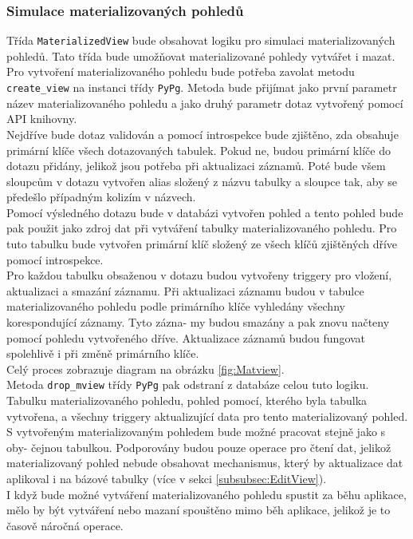 \documentclass[ing,male,java,dept456]{diploma}						%
\begin{document}
\subsubsection{Simulace materializovaných pohledů}

Třída \lstinline[style=inlinepython]|MaterializedView| bude obsahovat logiku pro simulaci materializovaných pohledů. Tato třída bude umožňovat materializované pohledy vytvářet i mazat. Pro vytvoření materializovaného pohledu bude potřeba zavolat metodu \lstinline[style=inlinepython]|create_view| na instanci třídy \lstinline[style=inlinepython]|PyPg|. Metoda bude přijímat jako první parametr název materializovaného pohledu a jako druhý parametr dotaz vytvořený pomocí API knihovny. \\
Nejdříve bude dotaz validován a pomocí introspekce bude zjištěno, zda obsahuje primární klíče všech dotazovaných tabulek. Pokud ne, budou primární klíče do dotazu přidány, jelikož jsou potřeba při aktualizaci záznamů. Poté bude všem sloupcům v dotazu vytvořen alias složený z názvu tabulky a sloupce tak, aby se předešlo případným kolizím v názvech. \\
Pomocí výsledného dotazu bude v databázi vytvořen pohled a tento pohled bude pak použit jako zdroj dat při vytváření tabulky materializovaného pohledu. Pro tuto tabulku bude vytvořen primární klíč složený ze všech klíčů zjištěných dříve pomocí introspekce. \\
Pro každou tabulku obsaženou v dotazu budou vytvořeny triggery pro vložení, aktualizaci a smazání záznamu. Při aktualizaci záznamu budou v tabulce materializovaného pohledu podle primárního klíče vyhledány všechny korespondující záznamy. Tyto zázna- my budou smazány a pak znovu načteny pomocí pohledu vytvořeného dříve. Aktualizace záznamů budou fungovat spolehlivě i při změně primárního klíče. \\
Celý proces zobrazuje diagram na obrázku \ref{fig:Matview}. \\
Metoda \lstinline[style=inlinepython]|drop_mview| třídy \lstinline[style=inlinepython]|PyPg| pak odstraní z databáze celou tuto logiku. Tabulku materializovaného pohledu, pohled pomocí, kterého byla tabulka vytvořena, a všechny triggery aktualizující data pro tento materializovaný pohled. \\
S vytvořeným materializovaným pohledem bude možné pracovat stejně jako s oby- čejnou tabulkou. Podporovány budou pouze operace pro čtení dat, jelikož materializovaný pohled nebude obsahovat mechanismus, který by aktualizace dat aplikoval i na bázové tabulky (více v sekci \ref{subsubsec:EditView}). \\
I když bude možné vytváření materializovaného pohledu spustit za běhu aplikace, mělo by být vytváření nebo mazaní spouštěno mimo běh aplikace, jelikož je to časově náročná operace. \\
\end{document}
